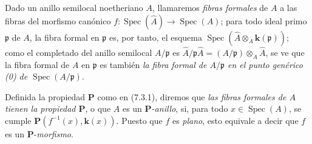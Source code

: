 \begin{env}[7.3.13]
\label{IV.2.s7.3.13-fr}
Dado un anillo semilocal noetheriano $A$, llamaremos \emph{fibras
formales} de $A$ a las fibras del morfismo canónico
$f:\operatorname{Spec}(\widehat A)\to\operatorname{Spec}(A)$; para todo
ideal primo $\mathfrak p$ de $A$, la fibra formal en $\mathfrak p$ es,
por tanto, el esquema
$\operatorname{Spec}(\widehat A\otimes_A \boldsymbol{k}(\mathfrak p))$; como el
completado del anillo semilocal $A/\mathfrak p$ es
$\widehat A/\mathfrak p\widehat A=(A/\mathfrak p)\otimes_A\widehat A$,
se ve que la fibra formal de $A$ en $\mathfrak p$ es también \emph{la
fibra formal de $A/\mathfrak p$ en el punto genérico \textup{(0)} de
$\operatorname{Spec}(A/\mathfrak p)$}.
\end{env}


Definida la propiedad $\boldsymbol P$ como en (7.3.1), diremos que
\emph{las fibras formales de $A$ tienen la propiedad $\boldsymbol P$},
o que $A$ es un \emph{$\boldsymbol P$-anillo}, si, para todo
$x\in\operatorname{Spec}(A)$, se cumple
$\boldsymbol P(f^{-1}(x),\boldsymbol{k}(x))$. Puesto que $f$ es \emph{plano}, esto
equivale a decir que $f$ es un $\boldsymbol P$-\emph{morfismo}.
